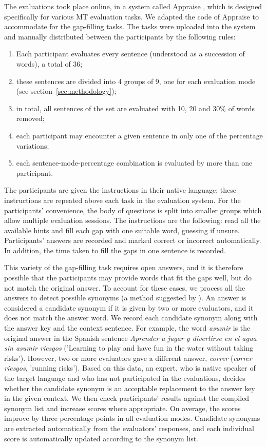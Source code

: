 \documentclass[11pt]{article}
\newcommand{\comment}[1]{}
\begin{document}
The evaluations took place online, in a system called Appraise \citep{federmann12}, which is 
designed specifically for various MT evaluation tasks. We adapted the code of Appraise to 
accommodate for the gap-filling tasks. The tasks were uploaded into the system and 
manually distributed between the participants by the following rules:
\begin{enumerate}\itemsep -0.3ex
\item  Each participant evaluates every sentence (understood as a succession of words),
a total of 36;
\item  these sentences are divided into 4 groups of 9, one for each evaluation mode (see section~\ref{sec:methodology});
\item in total, all sentences of the set are evaluated with 10, 20 and 30\% of words removed;
\item each participant may encounter a given sentence in only one of the percentage variations;
\item  each sentence-mode-percentage combination is evaluated by more than one participant.
\end{enumerate}


The participants are given the instructions in their native language; these instructions are repeated above each task in the evaluation system. For the participants' convenience, the body of questions is split into smaller groups which allow multiple evaluation sessions. The instructions are the 
following: read all the available hints and fill each gap with one suitable word, guessing if unsure.
Participants' answers are recorded and marked correct or incorrect automatically. \comment{EA 11,16: should I try to clarify this? one of the reviewers thought it was manual work}In
addition, the time taken to fill the gaps in one sentence is recorded.

This variety of the gap-filling task requires open answers, and it is therefore possible that the participants may
provide words that fit the gaps well, but do not match the original answer. To account for
these cases, we process all the answers to detect possible synonyms (a method suggested by \cite{oregan13}). An answer is
considered a candidate synonym if it is given by two or more evaluators, and it does not match
the answer word. We record each candidate synonym along with the answer key and the
context sentence. For example, the word \emph{asumir} is the original answer in the Spanish sentence \emph{Aprender a jugar y divertirse en el agua sin asumir riesgos} ('Learning to play and have fun in the water without taking risks'). However, two or more evaluators gave a different answer, \emph{correr} (\emph{correr riesgos}, 'running risks'). Based on this data, an expert, who is native speaker of the target language and who has not participated in the evaluations, decides
whether the candidate synonym is an acceptable replacement to the answer key in the given
context. We then check participants' results against the compiled synonym list and
increase scores where appropriate. On average, the scores improve by three percentage points in all evaluation modes. Candidate synonyms are extracted automatically from the evaluators' responses,  and each individual score is automatically updated according to the synonym list.
\end{document}
